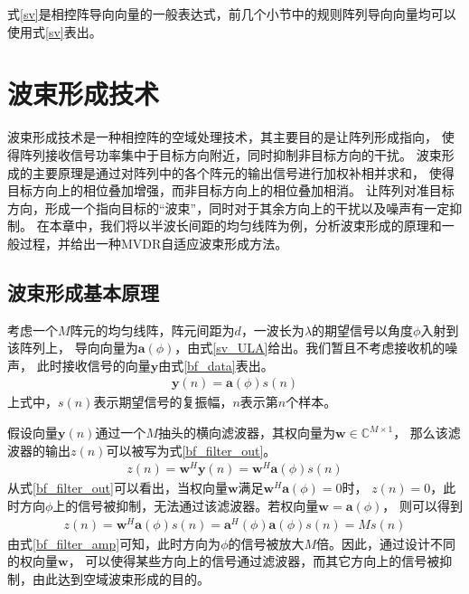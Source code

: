 \documentclass[master]{thesis-uestc}
\begin{document}
式\eqref{sv}是相控阵导向向量的一般表达式，前几个小节中的规则阵列导向向量均可以使用式\eqref{sv}表出。

\section{波束形成技术}
波束形成技术是一种相控阵的空域处理技术，其主要目的是让阵列形成指向，
使得阵列接收信号功率集中于目标方向附近，同时抑制非目标方向的干扰。
波束形成的主要原理是通过对阵列中的各个阵元的输出信号进行加权补相并求和，
使得目标方向上的相位叠加增强，而非目标方向上的相位叠加相消。
让阵列对准目标方向，形成一个指向目标的“波束”，同时对于其余方向上的干扰以及噪声有一定抑制。
在本章中，我们将以半波长间距的均匀线阵为例，分析波束形成的原理和一般过程，并给出一种MVDR自适应波束形成方法。

\subsection{波束形成基本原理}
考虑一个$M$阵元的均匀线阵，阵元间距为$d$，一波长为$\lambda$的期望信号以角度$\phi$入射到该阵列上，
导向向量为$\bm{a}(\phi)$，由式\eqref{sv_ULA}给出。我们暂且不考虑接收机的噪声，
此时接收信号的向量$\bm{y}$由式\eqref{bf_data}表出。
\begin{equation}\label{bf_data}
    \begin{aligned}
        \bm{y}(n) = \bm{a}(\phi)s(n)
    \end{aligned}
\end{equation}
上式中，$s(n)$表示期望信号的复振幅，$n$表示第$n$个样本。

假设向量$\bm{y}(n)$通过一个$M$抽头的横向滤波器，其权向量为$\bm{w}\in\mathbb{C}^{M\times1}$，
那么该滤波器的输出$z(n)$可以被写为式\eqref{bf_filter_out}。
\begin{equation}\label{bf_filter_out}
    \begin{aligned}
        z(n) = \bm{w}^H\bm{y}(n) = \bm{w}^H\bm{a}(\phi)s(n)
    \end{aligned}
\end{equation}
从式\eqref{bf_filter_out}可以看出，当权向量$\bm{w}$满足$\bm{w}^H\bm{a}(\phi)=0$时，
$z(n)=0$，此时方向$\phi$上的信号被抑制，无法通过该滤波器。若权向量$\bm{w}=\bm{a}(\phi)$，
则可以得到
\begin{equation}\label{bf_filter_amp}
    \begin{aligned}
        z(n) = \bm{w}^H\bm{a}(\phi)s(n) = \bm{a}^H(\phi)\bm{a}(\phi)s(n) = Ms(n)
    \end{aligned}
\end{equation}
由式\eqref{bf_filter_amp}可知，此时方向为$\phi$的信号被放大$M$倍。因此，通过设计不同的权向量$\bm{w}$，
可以使得某些方向上的信号通过滤波器，而其它方向上的信号被抑制，由此达到空域波束形成的目的。
\end{document}
